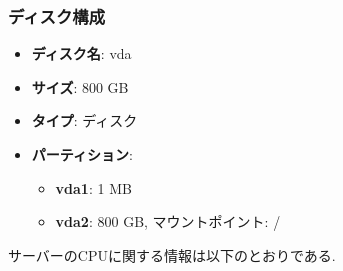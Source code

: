 \documentclass[b5paper,12pt]{jsreport}
\begin{document}
\subsubsection{ディスク構成}
\begin{itemize}
    \item \textbf{ディスク名}: vda
    \item \textbf{サイズ}: 800 GB
    \item \textbf{タイプ}: ディスク
    \item \textbf{パーティション}:
        \begin{itemize}
            \item \textbf{vda1}: 1 MB
            \item \textbf{vda2}: 800 GB, マウントポイント: /
        \end{itemize}
\end{itemize}


サーバーのCPUに関する情報は以下のとおりである.
\end{document}
